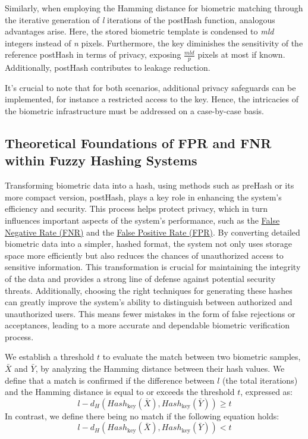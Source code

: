 Similarly, when employing the Hamming distance for biometric matching through the iterative generation of \textit{l} iterations of the postHash function, analogous advantages arise. Here, the stored biometric template is condensed to \textit{mld} integers instead of \textit{n} pixels. Furthermore, the key diminishes the sensitivity of the reference postHash in terms of privacy, exposing \(\frac{mld}{p}\) pixels at most if known. Additionally, postHash contributes to leakage reduction.

It's crucial to note that for both scenarios, additional privacy safeguards can be implemented, for instance a restricted access to the key. Hence, the intricacies of the biometric infrastructure must be addressed on a case-by-case basis.

\subsection{Theoretical Foundations of FPR and FNR within Fuzzy Hashing Systems}

Transforming biometric data into a hash, using methods such as preHash or its more compact version, postHash, plays a key role in enhancing the system's efficiency and security. This process helps protect privacy, which in turn influences important aspects of the system's performance, such as the \hyperref[def:FNR]{False Negative Rate (FNR)} and the \hyperref[def:FPR]{False Positive Rate (FPR)}. By converting detailed biometric data into a simpler, hashed format, the system not only uses storage space more efficiently but also reduces the chances of unauthorized access to sensitive information. This transformation is crucial for maintaining the integrity of the data and provides a strong line of defense against potential security threats. Additionally, choosing the right techniques for generating these hashes can greatly improve the system's ability to distinguish between authorized and unauthorized users. This means fewer mistakes in the form of false rejections or acceptances, leading to a more accurate and dependable biometric verification process.

We establish a threshold \(t\) to evaluate the match between two biometric samples, \(\bar{X}\) and \(\bar{Y}\), by analyzing the Hamming distance between their hash values.
We define that a match is confirmed if the difference between \(l\) (the total iterations) and the Hamming distance is equal to or exceeds the threshold \(t\), expressed as: \[l - d_H(Hash_{\text{key}}(\bar{X}), Hash_{\text{key}}(\bar{Y})) \geq t\]
In contrast, we define there being no match if the following equation holds: \[l - d_H(Hash_{\text{key}}(\bar{X}), Hash_{\text{key}}(\bar{Y})) < t\]


